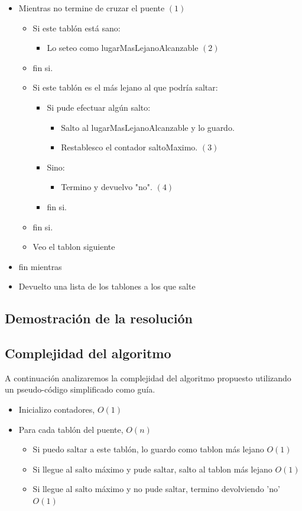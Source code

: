 \begin{itemize}
\item Mientras no termine de cruzar el puente $(1)$
	\begin{itemize}
	\item Si este tablón est\'a sano:
		\begin{itemize}
		\item Lo seteo como lugarMasLejanoAlcanzable $(2)$
		\end{itemize}
	\item fin si.

	\item Si este tablón es el más lejano al que podría saltar:
		\begin{itemize}
		\item Si pude efectuar algún salto:
			\begin{itemize}
			\item Salto al lugarMasLejanoAlcanzable y lo guardo. 
			\item Restablesco el contador saltoMaximo. $(3)$
			\end{itemize}
		\item Sino:
			\begin{itemize}
			\item Termino y devuelvo "no". $(4)$
			\end{itemize}
		\item fin si.
		\end{itemize}
	\item fin si.
	\item Veo el tablon siguiente
	\end{itemize}
\item fin mientras
\item Devuelto una lista de los tablones a los que salte
\end{itemize}


\subsection{Demostraci\'on de la resoluci\'on}


\subsection{Complejidad del algoritmo}

A continuación analizaremos la complejidad del algoritmo propuesto utilizando un pseudo-código simplificado como guía.

\begin{itemize}
\item Inicializo contadores,													$O(1)$
\item Para cada tablón del puente, 												$O(n)$
	\begin{itemize}
	\item Si puedo saltar a este tablón, lo guardo como tablon más lejano		$O(1)$
	\item Si llegue al salto máximo y pude saltar, salto al tablon más lejano	$O(1)$
	\item Si llegue al salto máximo y no pude saltar, termino devolviendo 'no'	$O(1)$
	\end{itemize}
\end{itemize}


